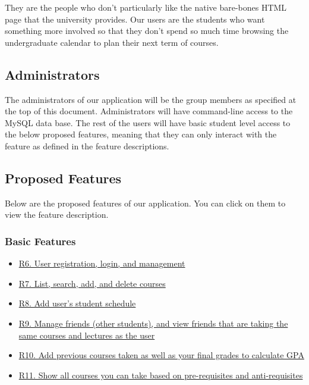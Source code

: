 \documentclass[12pt, a4paper]{article}
\begin{document}
They are the people who don't particularly like the native bare-bones HTML page that the university provides. Our users are the students who want something more involved so that they don't spend so much time browsing the undergraduate calendar to plan their next term of courses.

\subsection*{Administrators}
The administrators of our application will be the group members as specified at the top of this document. Administrators will have command-line access to the MySQL data base. The rest of the users will have basic student level access to the below proposed features, meaning that they can only interact with the feature as defined in the feature descriptions.

\subsection*{Proposed Features}
Below are the proposed features of our application. You can click on them to view the feature description.
\subsubsection*{Basic Features}
\begin{itemize}
    \item \hyperref[sec:R6]{R6. User registration, login, and management}
    \item \hyperref[sec:R7]{R7. List, search, add, and delete courses}
    \item \hyperref[sec:R8]{R8. Add user's student schedule}
    \item \hyperref[sec:R9]{R9. Manage friends (other students), and view friends that are taking the same courses and lectures as the user}
    \item \hyperref[sec:R10]{R10. Add previous courses taken as well as your final grades to calculate GPA}
    \item \hyperref[sec:R11]{R11. Show all courses you can take based on pre-requisites and anti-requisites}
\end{itemize}
\end{document}
